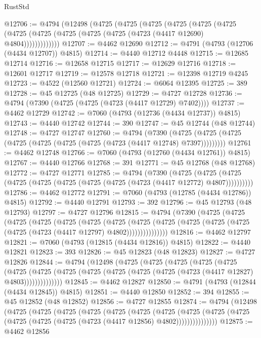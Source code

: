\begin{lexlean}{RustStd}
\begin{coremodule}
{\begin{coremodule}
{{{{{{{{{{{{{{{{{{{{{{{{{{{{{{{{{{{{{{{{{{{{{{{{{{{{{{{{{{{{@12706 := @4794
    (@12498
      (@4725
        (@4725
          (@4725
            (@4725
              (@4725
                (@4725 (@4725 (@4725 (@4725 (@4725 (@4725 (@4723 (@4417 @12690) @4804)))))))))))))
@12707 := @4462 @12690
@12712 := @4791 (@4793 (@12706 (@4434 @12707)) @4815)
@12714 := @4440 @12712 @4448
@12715 := @12685 @12714
@12716 := @12658 @12715
@12717 := @12629 @12716
@12718 := @12601 @12717
@12719 := @12578 @12718
@12721 := @12398 @12719 @4245
@12723 := @4522 (@12560 @12721)
@12724 := @6064 @12395
@12725 := 389
@12728 := @45 @12725 (@48 @12725)
@12729 := @4727 @12728
@12736 := @4794 (@7390 (@4725 (@4725 (@4723 (@4417 @12729) @7402))))
@12737 := @4462 @12729
@12742 := @7060 (@4793 (@12736 (@4434 @12737)) @4815)
@12743 := @4440 @12742
@12744 := 390
@12747 := @45 @12744 (@48 @12744)
@12748 := @4727 @12747
@12760 := @4794
    (@7390 (@4725 (@4725 (@4725 (@4725 (@4725 (@4725 (@4725 (@4723 (@4417 @12748) @7397)))))))))
@12761 := @4462 @12748
@12766 := @7060 (@4793 (@12760 (@4434 @12761)) @4815)
@12767 := @4440 @12766
@12768 := 391
@12771 := @45 @12768 (@48 @12768)
@12772 := @4727 @12771
@12785 := @4794
    (@7390
      (@4725 (@4725 (@4725 (@4725 (@4725 (@4725 (@4725 (@4725 (@4723 (@4417 @12772) @4807))))))))))
@12786 := @4462 @12772
@12791 := @7060 (@4793 (@12785 (@4434 @12786)) @4815)
@12792 := @4440 @12791
@12793 := 392
@12796 := @45 @12793 (@48 @12793)
@12797 := @4727 @12796
@12815 := @4794
    (@7390
      (@4725
        (@4725
          (@4725
            (@4725
              (@4725
                (@4725
                  (@4725
                    (@4725
                      (@4725 (@4725 (@4725 (@4725 (@4725 (@4723 (@4417 @12797) @4802)))))))))))))))
@12816 := @4462 @12797
@12821 := @7060 (@4793 (@12815 (@4434 @12816)) @4815)
@12822 := @4440 @12821
@12823 := 393
@12826 := @45 @12823 (@48 @12823)
@12827 := @4727 @12826
@12844 := @4794
    (@12498
      (@4725
        (@4725
          (@4725
            (@4725
              (@4725
                (@4725
                  (@4725
                    (@4725 (@4725 (@4725 (@4725 (@4725 (@4723 (@4417 @12827) @4803))))))))))))))
@12845 := @4462 @12827
@12850 := @4791 (@4793 (@12844 (@4434 @12845)) @4815)
@12851 := @4440 @12850
@12852 := 394
@12855 := @45 @12852 (@48 @12852)
@12856 := @4727 @12855
@12874 := @4794
    (@12498
      (@4725
        (@4725
          (@4725
            (@4725
              (@4725
                (@4725
                  (@4725
                    (@4725
                      (@4725 (@4725 (@4725 (@4725 (@4725 (@4723 (@4417 @12856) @4802)))))))))))))))
@12875 := @4462 @12856
}}}}}}}}}}}}}}}}}}}}}}}}}}}}}}}}}}}}}}}}}}}}}}}}}}}}}}}}}}}}
\end{coremodule}}
\end{coremodule}
\end{lexlean}
